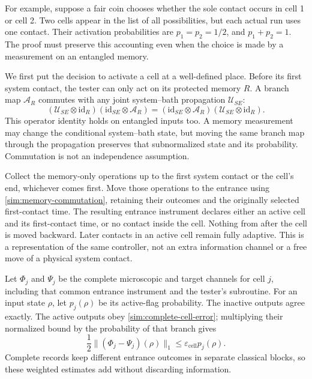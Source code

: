 \documentclass[11pt,a4paper]{article}
\numberwithin{equation}{section}
\theoremstyle{remark}
\begin{document}
For example, suppose a fair coin chooses whether the sole contact occurs
in cell 1 or cell 2. Two cells appear in the list of all possibilities,
but each actual run uses one contact. Their activation probabilities are
$p_1=p_2=1/2$, and $p_1+p_2=1$. The proof must preserve this accounting
even when the choice is made by a measurement on an entangled memory.

We first put the decision to activate a cell at a well-defined place.
Before its first system contact, the tester can only act on its protected
memory $R$. A branch map $\mathcal A_R$ commutes with any joint
system--bath propagation $\mathcal U_{SE}$:
\begin{equation}
 (\mathcal U_{SE}\otimes\mathrm{id}_R)
 (\mathrm{id}_{SE}\otimes\mathcal A_R)
 = (\mathrm{id}_{SE}\otimes\mathcal A_R)
 (\mathcal U_{SE}\otimes\mathrm{id}_R).
 \label{sim:memory-commutation}
\end{equation}
This operator identity holds on entangled inputs too. A memory measurement
may change the conditional system--bath state, but moving the same branch
map through the propagation preserves that subnormalized state and its
probability. Commutation is not an independence assumption.

Collect the memory-only operations up to the first system contact or the
cell's end, whichever comes first. Move those operations to the entrance
using \eqref{sim:memory-commutation}, retaining their outcomes and the
originally selected first-contact time. The resulting entrance instrument
declares either an active cell and its first-contact time, or no contact
inside the cell. Nothing from after the cell is moved backward. Later
contacts in an active cell remain fully adaptive. This is a representation
of the same controller, not an extra information channel or a free move
of a physical system contact.

Let $\Phi_j$ and $\Psi_j$ be the complete microscopic and target channels
for cell $j$, including that common entrance instrument and the tester's
subroutine. For an input state $\rho$, let $p_j(\rho)$ be its active-flag
probability. The inactive outputs agree exactly. The active outputs obey
\eqref{sim:complete-cell-error}; multiplying their normalized bound by
the probability of that branch gives
\begin{equation}
 \frac12\|(\Phi_j-\Psi_j)(\rho)\|_1
 \le\varepsilon_{\mathrm{cell}}p_j(\rho).
 \label{sim:weighted-cell}
\end{equation}
Complete records keep different entrance outcomes in separate classical
blocks, so these weighted estimates add without discarding information.
\end{document}
